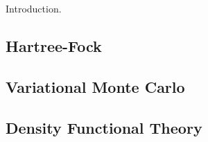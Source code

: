 Introduction.

\subsection{Hartree-Fock}

\subsection{Variational Monte Carlo}

\subsection{Density Functional Theory}
